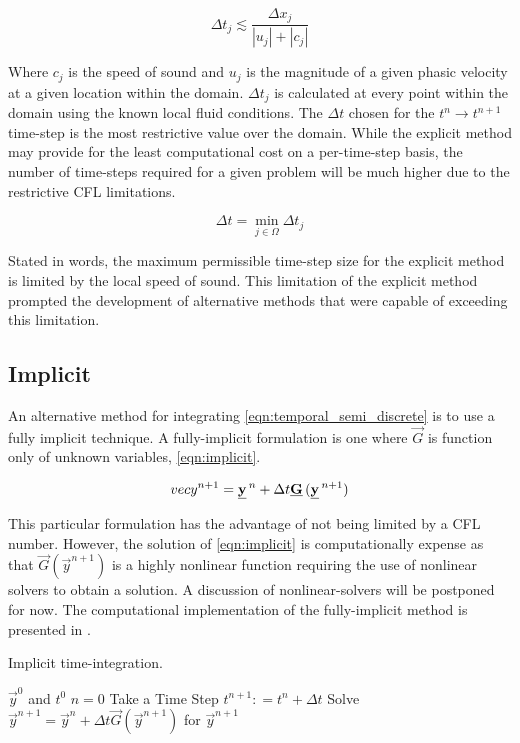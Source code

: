 \begin{equation}
\label{eqn:cfl_explicit}
\Delta t_j \lesssim \frac{\Delta x_j}{|u_j|+|c_j|}
\end{equation}

Where $c_j$ is the speed of sound and $u_j$ is the magnitude of a given phasic velocity at a given location within the domain.
$\Delta t_j$ is calculated at every point within the domain using the known local fluid conditions.
The $\Delta t$ chosen for the $t^{n} \rightarrow t^{n+1}$ time-step is the most restrictive value over the domain.
While the explicit method may provide for the least computational cost on a per-time-step basis, the number of time-steps required for a given problem will be much higher due to the restrictive CFL limitations.

\begin{equation}
\label{eqn:global_cfl}
\Delta t = \min_{j \in \Omega} \Delta t_j
\end{equation}

Stated in words, the maximum permissible time-step size for the explicit method is limited by the local speed of sound.
This limitation of the explicit method prompted the development of alternative methods that were capable of exceeding this limitation.

\subsection{Implicit}
\label{subsect:numerics_fully_implicit}
An alternative method for integrating \eqref{eqn:temporal_semi_discrete} is to use a fully implicit technique.
A fully-implicit formulation is one where $\vec{G}$ is function only of unknown variables, \eqref{eqn:implicit}.

\begin{equation}
\label{eqn:implicit}
\\vec{y}^{n+1} = \vec{y}^{n} + \Delta t \vec{G}(\vec{y}^{n+1})
\end{equation}

This particular formulation has the advantage of not being limited by a CFL number.
However, the solution of \eqref{eqn:implicit} is computationally expense as that $\vec{G}(\vec{y}^{n+1})$ is a highly nonlinear function requiring the use of nonlinear solvers to obtain a solution.
A discussion of nonlinear-solvers will be postponed for now.
The computational implementation of the fully-implicit method is presented in .

\begin{algo}[H]
\caption{Implicit time-integration.}
\label{algo:implicit}
\setlength{\baselineskip}{0.625\baselineskip}
\begin{algorithmic}[1]
\Require $\vec{y}^{0}$ and $t^{0}$
\Set $n = 0$
\Loop \; Take a Time Step	
    \State $t^{n+1} : = t^{n} + \Delta t$
    \BlackBox Solve $\vec{y}^{n+1} = \vec{y}^{n} + \Delta t \vec{G}(\vec{y}^{n+1})$ for $\vec{y}^{n+1}$
\end{algorithmic}
\end{algo}

